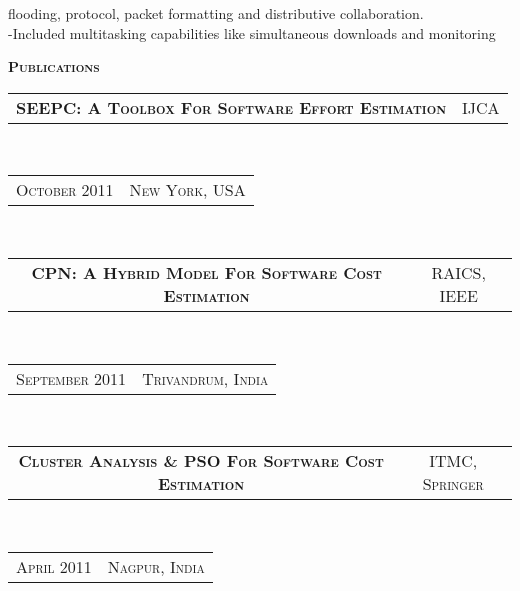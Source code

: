 \documentclass[10pt,a4paper,oneside]{article}
\begin{document}
\begin{minipage}[t]{0.63\textwidth}
\begin{adjustwidth}{7pt}{0pt}
{        flooding, protocol, packet formatting and distributive
        collaboration.\\
        -Included multitasking capabilities like simultaneous
        downloads and monitoring}\\
        \end{adjustwidth}
        \textcolor{light-gray}{\textbf{\large P\textsc{ublications}}}
        \vspace{10pt}\\
        \begin{tabular}{c|c}
            \textbf{\normalsize SEEPC: A T\textsc{oolbox}
            F\textsc{or} S\textsc{oftware} E\textsc{ffort}
        E\textsc{stimation}}
            &\textmd{\normalsize IJCA}
        \end{tabular}\\
        \textcolor{light-gray}{
            \begin{tabular}{c|c}
                {\small O\textsc{ctober 2011}}
                &{\small N\textsc{ew} Y\textsc{ork}, USA}
            \end{tabular}
        \vspace{10pt}
        }\\ 
        \begin{tabular}{c|c}
            \textbf{\normalsize CPN: A H\textsc{ybrid}
            M\textsc{odel} F\textsc{or} S\textsc{oftware}
        C\textsc{ost} E\textsc{stimation}}
            &\textmd{\normalsize RAICS, IEEE}
        \end{tabular}\\
        \textcolor{light-gray}{
            \begin{tabular}{c|c}
                {\small S\textsc{eptember 2011}}
                &{\small T\textsc{rivandrum}, I\textsc{ndia}}
            \end{tabular}
            \vspace{10pt}
        }\\ 
        \begin{tabular}{c|c}
            \textbf{\normalsize C\textsc{luster} A\textsc{nalysis} \& PSO F\textsc{or} S\textsc{oftware} C\textsc{ost} E\textsc{stimation}}
            &\textmd{\normalsize ITMC, S\textsc{pringer}}
        \end{tabular}\\
        \textcolor{light-gray}{
            \begin{tabular}{c|c}
                {\small A\textsc{pril 2011}}
                &{\small N\textsc{agpur}, I\textsc{ndia}}
            \end{tabular}
        }\\ 
    \end{minipage}
\end{document}
